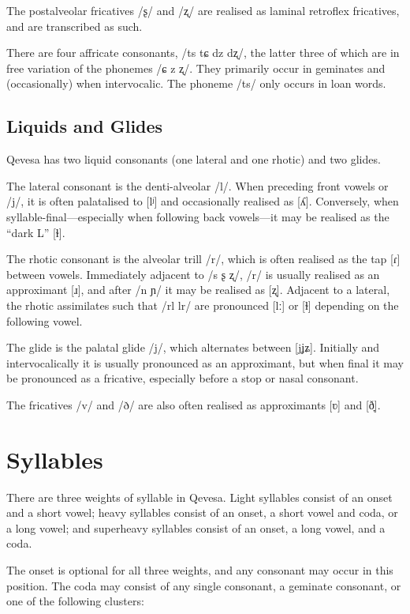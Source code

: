 \documentclass[grammar]{subfiles}
\begin{document}
The postalveolar fricatives /ʂ/ and /ʐ/ are realised as laminal retroflex
fricatives, and are transcribed as such.

There are four affricate consonants, /ts tɕ dz dʐ/, the latter three of which
are in free variation of the phonemes /ɕ z ʐ/.  They primarily occur in
geminates and (occasionally) when intervocalic.  The phoneme /ts/ only occurs
in loan words.


\subsection{Liquids and Glides}
\label{ssec:liquids}

Qevesa has two liquid consonants (one lateral and one rhotic) and two glides.

The lateral consonant is the denti-alveolar /l/.  When preceding front vowels
or /j/, it is often palatalised to [lʲ] and occasionally realised as [ʎ].
Conversely, when syllable-final—especially when following back vowels—it may be
realised as the “dark L” [ɫ].

The rhotic consonant is the alveolar trill /r/, which is often realised as the
tap [ɾ] between vowels.  Immediately adjacent to /s ʂ ʐ/, /r/ is usually
realised as an approximant [ɹ], and after /n ɲ/ it may be realised as [ʐ].
Adjacent to a lateral, the rhotic assimilates such that /rl lr/ are pronounced
[lː] or [ɫ] depending on the following vowel.

The glide is the palatal glide /j/, which alternates between [j\tlde ʝ\tlde ʑ].
Initially and intervocalically it is usually pronounced as an approximant, but
when final it may be pronounced as a fricative, especially before a stop or
nasal consonant.  

The fricatives /v/ and /ð/ are also often realised as approximants [ʋ] and [ð̞].  


\section{Syllables}
\label{sec:syllables}

There are three weights of syllable in Qevesa.  Light syllables consist of an
onset and a short vowel; heavy syllables consist of an onset, a short vowel and
coda, or a long vowel; and superheavy syllables consist of an onset, a long
vowel, and a coda. 

The onset is optional for all three weights, and any consonant may occur in
this position.  The coda may consist of any single consonant, a geminate
consonant, or one of the following clusters:
\end{document}
